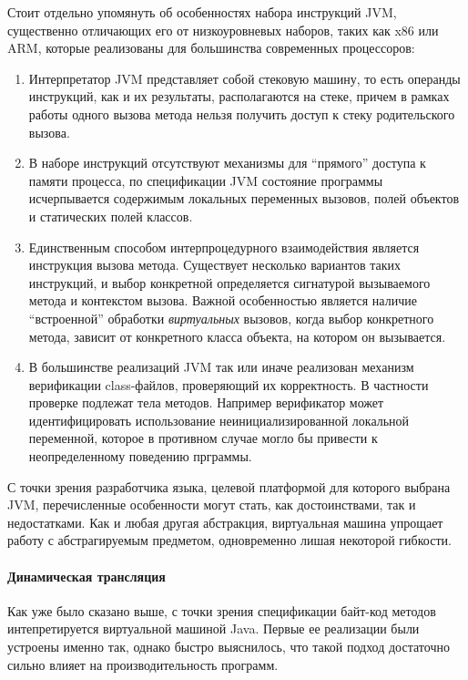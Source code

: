 Стоит отдельно упомянуть об особенностях набора инструкций JVM, существенно отличающих его
от низкоуровневых наборов, таких как x86 или ARM, которые реализованы для большинства современных
процессоров:
\begin{enumerate}
    \item Интерпретатор JVM представляет собой стековую машину, то есть операнды инструкций, как и
    их результаты, располагаются на стеке, причем в рамках работы одного вызова метода
    нельзя получить доступ к стеку родительского вызова.
    \item В наборе инструкций отсутствуют механизмы для ``прямого'' доступа к памяти процесса, по
    спецификации JVM состояние программы исчерпывается содержимым локальных переменных вызовов,
    полей объектов и статических полей классов.
    \item Единственным способом интерпроцедурного взаимодействия является инструкция вызова метода.
    Существует несколько вариантов таких инструкций, и выбор конкретной определяется сигнатурой
    вызываемого метода и контекстом вызова. Важной особенностью является наличие ``встроенной''
    обработки \textit{виртуальных} вызовов, когда выбор конкретного метода, зависит от конкретного
    класса объекта, на котором он вызывается.
    \item В большинстве реализаций JVM так или иначе реализован механизм верификации class-файлов,
    проверяющий их корректность. В частности проверке подлежат тела методов. Например верификатор
    может идентифицировать использование неинициализированной локальной переменной,
    которое в противном случае могло бы привести к неопределенному поведению прграммы.
\end{enumerate}

С точки зрения разработчика языка, целевой платформой для которого выбрана JVM, перечисленные
особенности могут стать, как достоинствами, так и недостатками. Как и любая другая абстракция,
виртуальная машина упрощает работу с абстрагируемым предметом, одновременно лишая некоторой
гибкости.

\paragraph{Динамическая трансляция}
Как уже было сказано выше, с точки зрения спецификации байт-код методов интепретируется виртуальной
машиной Java.
Первые ее реализации были устроены именно так, однако быстро выяснилось,
что такой подход достаточно сильно влияет на производительность программ\cite{JavaJIT}.

